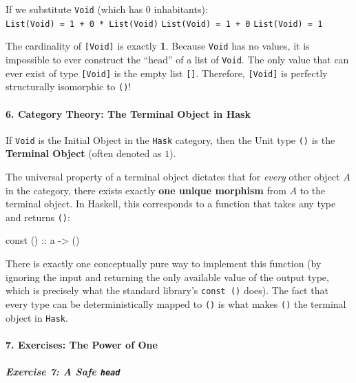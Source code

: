 \documentclass[
]{article}
\newenvironment{Shaded}{}{}
\newcommand{\FunctionTok}[1]{\textcolor[rgb]{0.02,0.16,0.49}{#1}}
\newcommand{\NormalTok}[1]{#1}
\newcommand{\OtherTok}[1]{\textcolor[rgb]{0.00,0.44,0.13}{#1}}
\begin{document}
If we substitute \texttt{Void} (which has 0 inhabitants):
\texttt{List(Void)\ =\ 1\ +\ 0\ *\ List(Void)}
\texttt{List(Void)\ =\ 1\ +\ 0} \texttt{List(Void)\ =\ 1}

The cardinality of \texttt{{[}Void{]}} is exactly \textbf{1}. Because
\texttt{Void} has no values, it is impossible to ever construct the
``head'' of a list of \texttt{Void}. The only value that can ever exist
of type \texttt{{[}Void{]}} is the empty list \texttt{{[}{]}}.
Therefore, \texttt{{[}Void{]}} is perfectly structurally isomorphic to
\texttt{()}!

\paragraph{6. Category Theory: The Terminal Object in
Hask}\label{category-theory-the-terminal-object-in-hask}

If \texttt{Void} is the Initial Object in the \texttt{Hask} category,
then the Unit type \texttt{()} is the \textbf{Terminal Object} (often
denoted as \(1\)).

The universal property of a terminal object dictates that for
\emph{every} other object \(A\) in the category, there exists exactly
\textbf{one unique morphism} from \(A\) to the terminal object. In
Haskell, this corresponds to a function that takes any type and returns
\texttt{()}:

\begin{Shaded}
\begin{Highlighting}[]
\FunctionTok{const}\OtherTok{ () ::}\NormalTok{ a }\OtherTok{{-}\textgreater{}}\NormalTok{ ()}
\end{Highlighting}
\end{Shaded}

There is exactly one conceptually pure way to implement this function
(by ignoring the input and returning the only available value of the
output type, which is precisely what the standard library's
\texttt{const\ ()} does). The fact that every type can be
deterministically mapped to \texttt{()} is what makes \texttt{()} the
terminal object in \texttt{Hask}.

\paragraph{7. Exercises: The Power of
One}\label{exercises-the-power-of-one}

\subparagraph{\texorpdfstring{Exercise 7: A Safe
\texttt{head}}{Exercise 7: A Safe head}}\label{exercise-7-a-safe-head}
\end{document}
